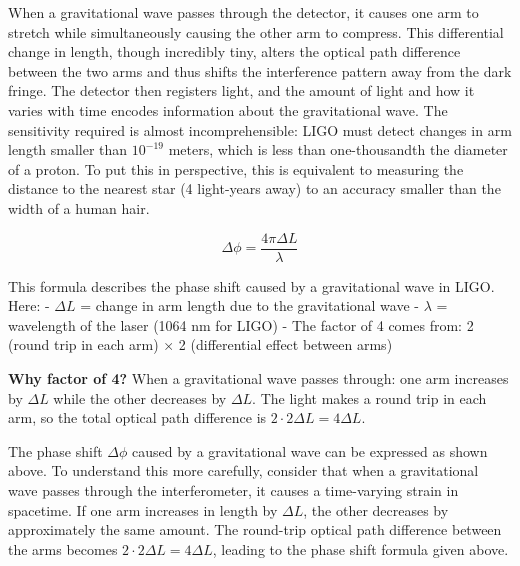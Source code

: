 \documentclass[
  a4paper,
]{book}
\begin{document}
When a gravitational wave passes through the detector, it causes one arm
to stretch while simultaneously causing the other arm to compress. This
differential change in length, though incredibly tiny, alters the
optical path difference between the two arms and thus shifts the
interference pattern away from the dark fringe. The detector then
registers light, and the amount of light and how it varies with time
encodes information about the gravitational wave. The sensitivity
required is almost incomprehensible: LIGO must detect changes in arm
length smaller than \(10^{-19}\) meters, which is less than
one-thousandth the diameter of a proton. To put this in perspective,
this is equivalent to measuring the distance to the nearest star (4
light-years away) to an accuracy smaller than the width of a human hair.

\begin{tcolorbox}[enhanced jigsaw, breakable, toptitle=1mm, bottomrule=.15mm, colbacktitle=quarto-callout-important-color!10!white, title=\textcolor{quarto-callout-important-color}{\faExclamation}\hspace{0.5em}{LIGO Phase Shift Formula}, arc=.35mm, rightrule=.15mm, bottomtitle=1mm, opacityback=0, toprule=.15mm, coltitle=black, leftrule=.75mm, opacitybacktitle=0.6, colback=white, left=2mm, titlerule=0mm, colframe=quarto-callout-important-color-frame]

\[\Delta \phi = \frac{4\pi \Delta L}{\lambda}\]

This formula describes the phase shift caused by a gravitational wave in
LIGO. Here: - \(\Delta L\) = change in arm length due to the
gravitational wave - \(\lambda\) = wavelength of the laser (1064 nm for
LIGO) - The factor of 4 comes from: 2 (round trip in each arm) × 2
(differential effect between arms)

\textbf{Why factor of 4?} When a gravitational wave passes through: one
arm increases by \(\Delta L\) while the other decreases by \(\Delta L\).
The light makes a round trip in each arm, so the total optical path
difference is \(2 \cdot 2\Delta L = 4\Delta L\).

\end{tcolorbox}

The phase shift \(\Delta \phi\) caused by a gravitational wave can be
expressed as shown above. To understand this more carefully, consider
that when a gravitational wave passes through the interferometer, it
causes a time-varying strain in spacetime. If one arm increases in
length by \(\Delta L\), the other decreases by approximately the same
amount. The round-trip optical path difference between the arms becomes
\(2 \cdot 2\Delta L = 4\Delta L\), leading to the phase shift formula
given above.
\end{document}
